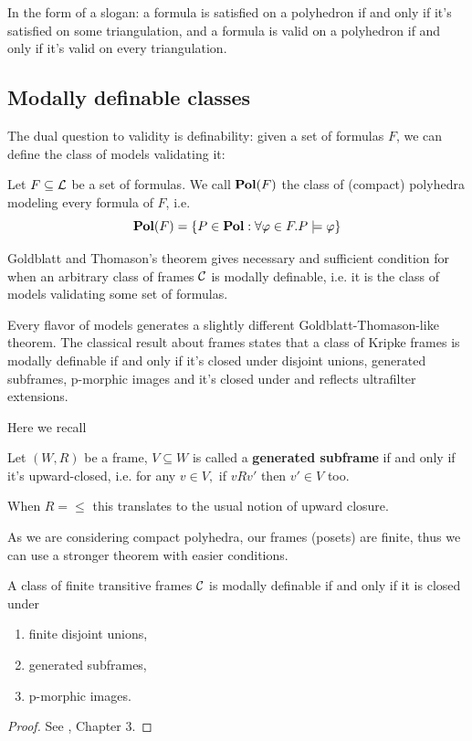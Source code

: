 In the form of a slogan: a formula is satisfied on a polyhedron if and only if it's satisfied on some triangulation,
and a formula is valid on a polyhedron if and only if it's valid on every triangulation.

\subsection{Modally definable classes}

The dual question to validity is definability: given a set of formulas $F$, we can define the class of models validating it:

\begin{definition}
    \label{MD1}
    Let $F\subseteq \operatorname{\mathcal{L}}$ be a set of formulas. We call $\operatorname{\textbf{Pol}}(F)$ the class of (compact) polyhedra modeling every formula of $F$, i.e.
    \[\operatorname{\textbf{Pol}}(F)=\left\{ P\in\operatorname{\textbf{Pol}}: \forall\varphi\in F. P\models\varphi \right\}\]
\end{definition}

Goldblatt and Thomason's theorem gives necessary and sufficient condition for when an arbitrary class of frames $\operatorname{\mathcal{C}}$ is modally definable, i.e. 
it is the class of models validating some set of formulas.

Every flavor of models generates a slightly different Goldblatt-Thomason-like theorem. The classical result about 
frames states that a class of Kripke frames is modally definable if and only if it's closed under disjoint unions,
generated subframes, p-morphic images and it's closed under and reflects ultrafilter extensions.

Here we recall
\begin{definition}
    Let $(W,R)$ be a frame, $V\subseteq W$ is called a \textbf{generated subframe}
    if and only if it's upward-closed, i.e. for any $v\in V, $ if $vRv'$ then $v'\in V$ too.

    When $R=\leq$ this translates to the usual notion of upward closure.
\end{definition}

As we are considering compact polyhedra, our frames (posets) are finite, thus we can use a stronger theorem with easier conditions.

\begin{theorem}
    \label{GTFT1}
    A class of finite transitive frames $\operatorname{\mathcal{C}}$ is modally definable if and only if it is closed under
    \begin{enumerate}
        \item finite disjoint unions,
        \item generated subframes,
        \item p-morphic images.
    \end{enumerate}
\end{theorem}
\begin{proof}
    See \cite{Blackburn_Rijke_Venema_2001}, Chapter 3.
\end{proof}

